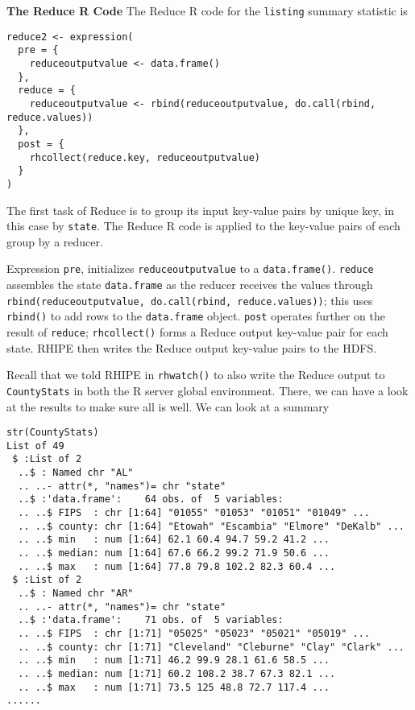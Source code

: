 \textbf{The Reduce R Code}
The Reduce R code for the \texttt{listing} summary statistic is

\begin{verbatim}
reduce2 <- expression(
  pre = {
    reduceoutputvalue <- data.frame()
  },
  reduce = {
    reduceoutputvalue <- rbind(reduceoutputvalue, do.call(rbind, reduce.values))
  },
  post = {
    rhcollect(reduce.key, reduceoutputvalue)
  }
)
\end{verbatim}

The first task of Reduce is to group its input key-value pairs by unique key,
in this case by \texttt{state}. The Reduce R code is applied to the key-value pairs
of each group by a reducer.

Expression \texttt{pre}, initializes \texttt{reduceoutputvalue} to a
\texttt{data.frame()}. \texttt{reduce} assembles the state \texttt{data.frame} as the
reducer receives the values through \texttt{rbind(reduceoutputvalue, do.call(rbind,
reduce.values))}; this uses \texttt{rbind()} to add rows to the \texttt{data.frame} object.
\texttt{post} operates further on the result of \texttt{reduce}; \texttt{rhcollect()} forms a Reduce
output key-value pair for each state. RHIPE then writes the Reduce output
key-value pairs to the HDFS.

Recall that we told RHIPE in \texttt{rhwatch()} to also write the Reduce output
to \texttt{CountyStats} in both the R server global environment. There, we can have a
look at the results to make sure all is well. We can look at a summary

\begin{verbatim}
str(CountyStats)
List of 49
 $ :List of 2
  ..$ : Named chr "AL"
  .. ..- attr(*, "names")= chr "state"
  ..$ :'data.frame':    64 obs. of  5 variables:
  .. ..$ FIPS  : chr [1:64] "01055" "01053" "01051" "01049" ...
  .. ..$ county: chr [1:64] "Etowah" "Escambia" "Elmore" "DeKalb" ...
  .. ..$ min   : num [1:64] 62.1 60.4 94.7 59.2 41.2 ...
  .. ..$ median: num [1:64] 67.6 66.2 99.2 71.9 50.6 ...
  .. ..$ max   : num [1:64] 77.8 79.8 102.2 82.3 60.4 ...
 $ :List of 2
  ..$ : Named chr "AR"
  .. ..- attr(*, "names")= chr "state"
  ..$ :'data.frame':    71 obs. of  5 variables:
  .. ..$ FIPS  : chr [1:71] "05025" "05023" "05021" "05019" ...
  .. ..$ county: chr [1:71] "Cleveland" "Cleburne" "Clay" "Clark" ...
  .. ..$ min   : num [1:71] 46.2 99.9 28.1 61.6 58.5 ...
  .. ..$ median: num [1:71] 60.2 108.2 38.7 67.3 82.1 ...
  .. ..$ max   : num [1:71] 73.5 125 48.8 72.7 117.4 ...
......
\end{verbatim}

